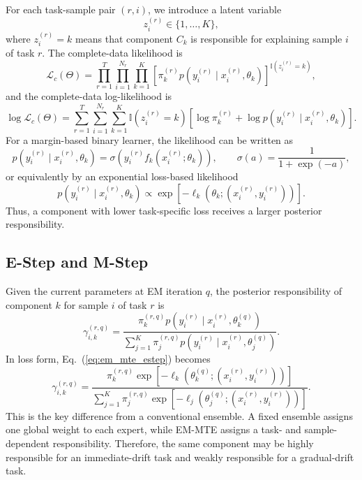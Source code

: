 \documentclass[12pt,a4paper]{article}
\begin{document}
	For each task-sample pair $(r,i)$, we introduce a latent variable
	\[
	z_i^{(r)}\in\{1,\ldots,K\},
	\]
	where $z_i^{(r)}=k$ means that component $C_k$ is responsible for explaining sample $i$ of task $r$. The complete-data likelihood is
	\begin{equation}
		\mathcal{L}_c(\Theta)
		=
		\prod_{r=1}^{T}\prod_{i=1}^{N_r}\prod_{k=1}^{K}
		\left[
		\pi_k^{(r)}
		p\!\left(y_i^{(r)}\mid x_i^{(r)},\theta_k\right)
		\right]^{\mathbb{I}(z_i^{(r)}=k)} ,
		\label{eq:em_mte_complete_likelihood}
	\end{equation}
	and the complete-data log-likelihood is
	\begin{equation}
		\log \mathcal{L}_c(\Theta)
		=
		\sum_{r=1}^{T}\sum_{i=1}^{N_r}\sum_{k=1}^{K}
		\mathbb{I}(z_i^{(r)}=k)
		\left[
		\log \pi_k^{(r)}
		+
		\log p\!\left(y_i^{(r)}\mid x_i^{(r)},\theta_k\right)
		\right].
		\label{eq:em_mte_complete_loglik}
	\end{equation}
	For a margin-based binary learner, the likelihood can be written as
	\begin{equation}
		p\!\left(y_i^{(r)}\mid x_i^{(r)},\theta_k\right)
		=
		\sigma\!\left(y_i^{(r)} f_k(x_i^{(r)};\theta_k)\right),
		\qquad
		\sigma(a)=\frac{1}{1+\exp(-a)} ,
		\label{eq:em_mte_margin_likelihood}
	\end{equation}
	or equivalently by an exponential loss-based likelihood
	\begin{equation}
		p\!\left(y_i^{(r)}\mid x_i^{(r)},\theta_k\right)
		\propto
		\exp\!\left[-\ell_k\!\left(\theta_k;(x_i^{(r)},y_i^{(r)})\right)\right].
		\label{eq:em_mte_loss_likelihood}
	\end{equation}
	Thus, a component with lower task-specific loss receives a larger posterior responsibility.
	
	\subsection{E-Step and M-Step}
	
	Given the current parameters at EM iteration $q$, the posterior responsibility of component $k$ for sample $i$ of task $r$ is
	\begin{equation}
		\gamma_{i,k}^{(r,q)}
		=
		\frac{
			\pi_k^{(r,q)}
			p\!\left(y_i^{(r)}\mid x_i^{(r)},\theta_k^{(q)}\right)
		}{
			\sum_{j=1}^{K}
			\pi_j^{(r,q)}
			p\!\left(y_i^{(r)}\mid x_i^{(r)},\theta_j^{(q)}\right)
		}.
		\label{eq:em_mte_estep}
	\end{equation}
	In loss form, Eq.~(\ref{eq:em_mte_estep}) becomes
	\begin{equation}
		\gamma_{i,k}^{(r,q)}
		=
		\frac{
			\pi_k^{(r,q)}
			\exp[-\ell_k(\theta_k^{(q)};(x_i^{(r)},y_i^{(r)}))]
		}{
			\sum_{j=1}^{K}
			\pi_j^{(r,q)}
			\exp[-\ell_j(\theta_j^{(q)};(x_i^{(r)},y_i^{(r)}))]
		}.
		\label{eq:em_mte_loss_estep}
	\end{equation}
	This is the key difference from a conventional ensemble. A fixed ensemble assigns one global weight to each expert, while EM-MTE assigns a task- and sample-dependent responsibility. Therefore, the same component may be highly responsible for an immediate-drift task and weakly responsible for a gradual-drift task.
	
\end{document}
